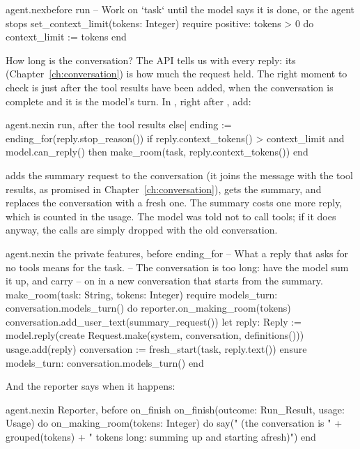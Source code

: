 \begin{addbefore}{agent.nex}{before run}{  -- Work on `task` until the model says it is done, or the agent stops}
  set_context_limit(tokens: Integer)
  require
    positive: tokens > 0
  do
    context_limit := tokens
  end
\end{addbefore}

How long is the conversation? The API tells us with every reply: its
 (Chapter~\ref{ch:conversation}) is how much the request
held. The right moment to check is just after the tool results have been
added, when the conversation is complete and it is the model's turn. In
, right after , add:

\begin{tightaddbefore}{agent.nex}{in run, after the tool results}{        else|          ending := ending_for(reply.stop_reason())}
          if reply.context_tokens() > context_limit and model.can_reply() then
            make_room(task, reply.context_tokens())
          end
\end{tightaddbefore}

 adds the summary request to the conversation (it joins the
message with the tool results, as  promised in
Chapter~\ref{ch:conversation}), gets the summary, and replaces the
conversation with a fresh one. The summary costs one more reply, which is
counted in the usage. The model was told not to call tools; if it does
anyway, the calls are simply dropped with the old conversation.

\begin{addbefore}{agent.nex}{in the private features, before ending_for}{    -- What a reply that asks for no tools means for the task.}
    -- The conversation is too long: have the model sum it up, and carry
    -- on in a new conversation that starts from the summary.
    make_room(task: String, tokens: Integer)
    require
      models_turn: conversation.models_turn()
    do
      reporter.on_making_room(tokens)
      conversation.add_user_text(summary_request())
      let reply: Reply := model.reply(create Request.make(system, conversation, definitions()))
      usage.add(reply)
      conversation := fresh_start(task, reply.text())
    ensure
      models_turn: conversation.models_turn()
    end
\end{addbefore}

And the reporter says when it happens:

\begin{addbefore}{agent.nex}{in Reporter, before on_finish}{  on_finish(outcome: Run_Result, usage: Usage) do}
  on_making_room(tokens: Integer) do
    say("  (the conversation is " + grouped(tokens) + " tokens long: summing up and starting afresh)")
  end
\end{addbefore}

